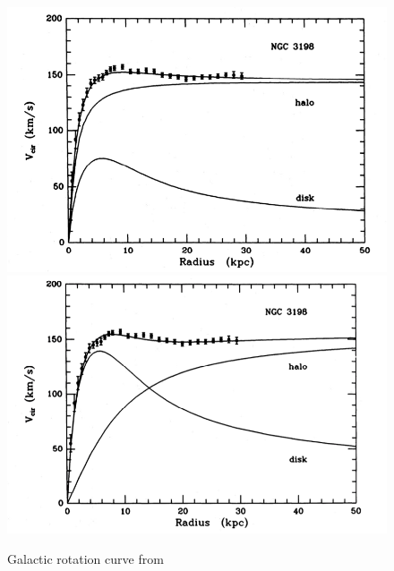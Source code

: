 \begin{figure}[htbp]
\begin{center}
\includegraphics[width=\halffig]{figures/theory/rot_curve2.png}
\includegraphics[width=\halffig]{figures/theory/rot_curve1.png}
\caption{Galactic rotation curve from \cite{Albada1985} }
\label{fig:rot_curve}
\end{center}
\end{figure}

